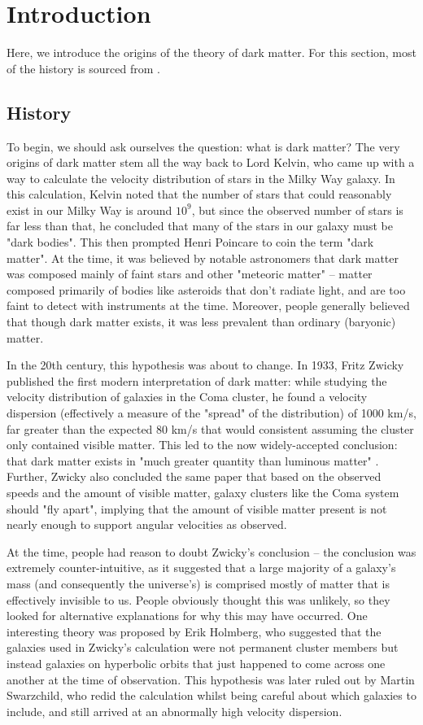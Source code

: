 \chapter{Introduction}
Here, we introduce the origins of the theory of dark matter. For this section, most of the history is sourced
from \cite{bertoneHistoryDarkMatter2018}. 

\section{History}
To begin, we should ask ourselves the question: what is dark matter? The very origins of dark matter stem all
the way back to Lord Kelvin, who came up with a way to calculate the velocity distribution of stars in the
Milky Way galaxy. In this calculation, Kelvin noted that the number of stars that could reasonably exist in
our Milky Way is around \( 10^{9} \), but since the observed number of stars is far less than that, he
concluded that many of the stars in our galaxy must be "dark bodies". This then prompted Henri Poincare to
coin the term "dark matter". At the time, it was believed by notable astronomers
that dark matter was composed mainly of faint stars and other "meteoric matter" -- matter composed primarily
of bodies like asteroids that don't radiate light, and are too faint to detect with instruments at the time.
Moreover, people generally believed that though dark matter exists, it was less prevalent than ordinary
(baryonic) matter. 

In the 20th century, this hypothesis was about to change. In 1933, Fritz Zwicky published the first modern
interpretation of dark matter: while studying the velocity distribution of galaxies in the Coma cluster, he
found a velocity dispersion (effectively a measure of the "spread" of the distribution) of 1000 km/s, far
greater than the expected 80 km/s that would consistent assuming the cluster only contained visible matter.   
This led to the now widely-accepted conclusion: that dark matter exists in "much greater quantity than
luminous matter" \cite{andernachEnglishSpanishTranslation2017}. 
Further, Zwicky also concluded the same paper that based on the observed speeds and
the amount of visible matter, galaxy clusters like the Coma system should "fly apart", implying that the
amount of visible matter present is not nearly enough to support angular velocities as observed.       
  
At the time, people had reason to doubt Zwicky's conclusion -- the conclusion was extremely
counter-intuitive, as it suggested that a large majority of a galaxy's mass (and consequently the universe's)
is comprised mostly of matter that is effectively invisible to us. People obviously thought this was
unlikely, so they looked for alternative explanations for why this may have occurred. One interesting
theory was proposed by Erik Holmberg, who suggested that the galaxies used in Zwicky's calculation were not
permanent cluster members but instead galaxies on hyperbolic orbits that just happened to come across one
another at the time of observation. This hypothesis was later ruled out by Martin Swarzchild, who
redid the calculation whilst being careful about which galaxies to include, and still arrived at an
abnormally high velocity dispersion. 

